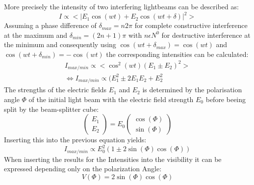 More precisely the intensity of two interfering lightbeams can be described as:
\begin{equation*}
I \propto \bigl<|E_1\cos(wt)+E_2\cos(wt+\delta)|^2\bigr>
\end{equation*}
Assuming a phase difference of $\delta_{max}=n2\pi$ for complete constructive interference at the maximum and $\delta_{min}=(2n+1)\pi$ with $n\epsilon N^0$ for destructive interference at the minimum and consequently using $\cos(wt+\delta_{max})=\cos(wt)$ and $\cos(wt+\delta_{min})=-\cos(wt)$ the corresponding intensities can be calculated:
\begin{gather*}
I_{max/min}\propto \bigl<\cos^2(wt)(E_1\pm E_2)^2\bigr> \\
\iff I_{max/min}\propto (E_1^2\pm 2E_1E_2 + E_2^2 
\end{gather*}
The strengths of the electric fields $E_1$ and $E_2$ is determined by the polarisation angle $\Phi$ of the initial light beam with the electric field strength $E_0$ before beeing split by the beam-splitter cube:
\begin{equation*}
\begin{pmatrix} E_1 \\ E_2\end{pmatrix}=E_0\begin{pmatrix}\cos(\Phi) \\ \sin(\Phi)\end{pmatrix}
\end{equation*}
Inserting this into the previous equation yields:
\begin{equation}
I_{max/min} \propto E_0^2(1\pm 2\sin(\Phi)\cos(\Phi))
\end{equation}
When inserting the results for the Intensities into the visibility it can be expressed depending only on the polarization Angle:
\begin{equation}
V (\Phi)=2\sin(\Phi)\cos(\Phi)
\end{equation}
